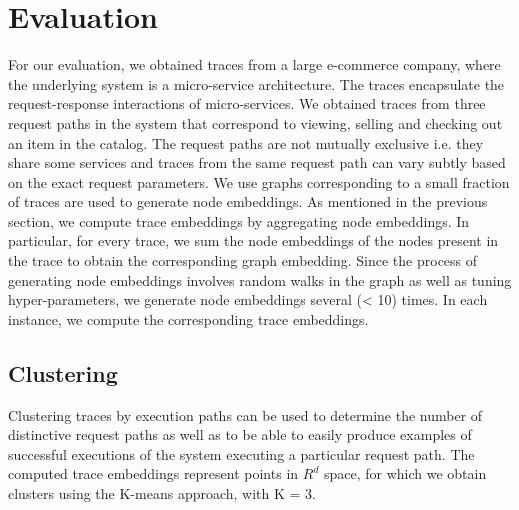 \section{Evaluation}
For our evaluation, we obtained traces from a large e-commerce company, where the underlying system is a micro-service architecture. The traces encapsulate the request-response interactions of micro-services. We obtained traces from three request paths in the system that correspond to viewing, selling and checking out an item in the catalog. The request paths are not mutually exclusive i.e. they share some services and traces from the same request path can vary subtly based on the exact request parameters. We use graphs corresponding to a small fraction of traces are used to generate node embeddings. As mentioned in the previous section, we compute trace embeddings by aggregating node embeddings. In particular, for every trace, we sum the node embeddings of the nodes present in the trace to obtain the corresponding graph embedding. Since the process of generating node embeddings involves random walks in the graph as well as tuning hyper-parameters, we generate node embeddings several (< 10) times. In each instance, we compute the corresponding trace embeddings. 

  
\subsection{Clustering}
 Clustering traces by execution paths can be used to determine the number of distinctive request paths as well as to be able to easily produce examples of successful executions of the system executing a particular request path. The computed trace embeddings represent points in $R^{d}$ space, for which we obtain clusters using the K-means approach, with K = 3. 
 
